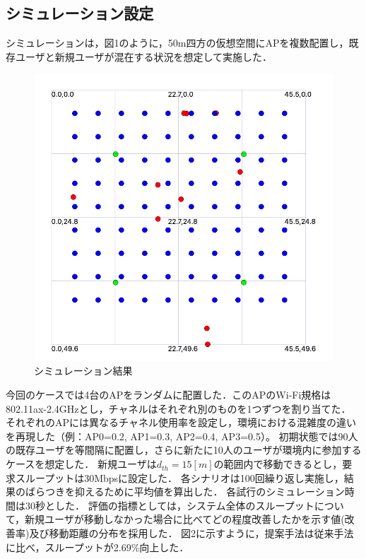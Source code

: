 \documentclass[dvipdfmx,twocolumn]{jsarticle}
\begin{document}
\subsection{シミュレーション設定}
シミュレーションは，図1のように，50m四方の仮想空間にAPを複数配置し，既存ユーザと新規ユーザが混在する状況を想定して実施した．
\begin{figure}[H]
  \centering
  \vspace{-4mm} %
  \includegraphics[width=0.8\linewidth]{simulation.png}
  \vspace{-2mm} %
  \caption{シミュレーション結果}
  \vspace{-9mm} %
\end{figure}
今回のケースでは4台のAPをランダムに配置した．このAPのWi-Fi規格は802.11ax-2.4GHzとし，チャネルはそれぞれ別のものを1つずつを割り当てた．
それぞれのAPには異なるチャネル使用率を設定し，環境における混雑度の違いを再現した（例：AP0=0.2, AP1=0.3, AP2=0.4, AP3=0.5）。
初期状態では90人の既存ユーザを等間隔に配置し，さらに新たに10人のユーザが環境内に参加するケースを想定した．
新規ユーザは$d_{th}=15[m]$の範囲内で移動できるとし，要求スループットは30Mbpsに設定した．
各シナリオは100回繰り返し実施し，結果のばらつきを抑えるために平均値を算出した．
各試行のシミュレーション時間は30秒とした．
評価の指標としては，システム全体のスループットについて，新規ユーザが移動しなかった場合に比べてどの程度改善したかを示す値(改善率)及び移動距離の分布を採用した．
図2に示すように，提案手法は従来手法に比べ，スループットが2.69\%向上した．
\end{document}
